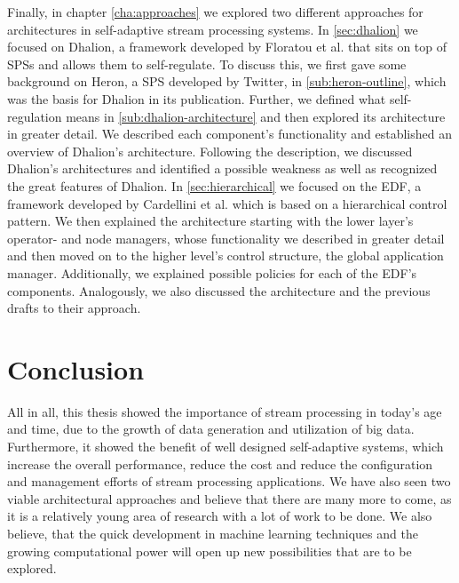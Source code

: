 \quad Finally, in chapter \ref{cha:approaches} we explored two different approaches for architectures in self-adaptive 
stream processing systems.
In \ref{sec:dhalion} we focused on Dhalion, a framework developed by Floratou et al. that sits on top of SPSs and allows them to self-regulate. 
To discuss this, we first gave some background on Heron, a SPS developed by Twitter, in \ref{sub:heron-outline}, which was the basis for Dhalion in its publication. 
Further, we defined what self-regulation means in \ref{sub:dhalion-architecture} and then explored its architecture in greater detail.
We described each component's functionality and established an overview of Dhalion's architecture.
Following the description, we discussed Dhalion's architectures and identified a possible weakness as well as recognized the great features of Dhalion.
In \ref{sec:hierarchical} we focused on the EDF, a framework developed by Cardellini et al. which is based on a hierarchical control pattern.
We then explained the architecture starting with the lower layer's operator- and node managers, whose functionality we described in greater detail 
and then moved on to the higher level's control structure, the global application manager. 
Additionally, we explained possible policies for each of the EDF's components. 
Analogously, we also discussed the architecture and the previous drafts to their approach.

\section{Conclusion}
\label{sec:conclusion}
All in all, this thesis showed the importance of stream processing in today's age and time, due to the 
growth of data generation and utilization of big data. Furthermore, it showed the benefit of well designed self-adaptive 
systems, which increase the overall performance, reduce the cost and reduce the configuration and management efforts of stream processing applications.
We have also seen two viable architectural approaches and believe that there are many more to come, as it is a relatively young 
area of research with a lot of work to be done. We also believe, that the quick development in machine learning techniques and the growing computational 
power will open up new possibilities that are to be explored.
